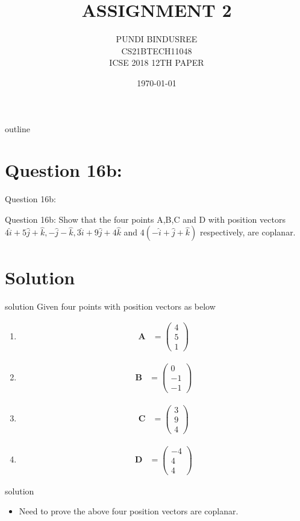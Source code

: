\documentclass{beamer}
\title{ASSIGNMENT 2}
\author{PUNDI BINDUSREE \\ CS21BTECH11048\\ ICSE 2018 12TH PAPER}
\date{\today}
\let\vec\mathbf
\newcommand{\myvec}[1]{\ensuremath{\begin{pmatrix}#1\end{pmatrix}}}
\begin{document}
\begin{frame}
\titlepage
\end{frame}

\logo{}
\begin{frame}{outline}
\tableofcontents
\end{frame}

\section{Question 16b:}
\begin{frame}{Question 16b:}
\begin{block}{Question 16b:}
Show that the four points A,B,C and D with position vectors $4\hat{i}+5\hat{j}+\hat{k},-\hat{j}-\hat{k},3\hat{i}+9\hat{j}+4\hat{k}$ and $4(-\hat{i}+\hat{j}+\hat{k})$ respectively, are coplanar.
\end{block}
\end{frame}


\section{Solution}
\begin{frame}{solution}
 Given four points with position vectors as below
\begin{enumerate}
     \item \begin{align}\vec{A} & =\myvec{4\\5\\1}\end{align}
     \item \begin{align}\vec{B} & =\myvec{0\\-1\\-1}\end{align}     
     \item \begin{align}\vec{C} & =\myvec{3\\9\\4}\end{align}     
     \item \begin{align}\vec{D} & =\myvec{-4\\4\\4}\end{align}
\end{enumerate}
\end{frame}
 
\begin{frame}{solution}
\begin{itemize}
    \item Need to prove the above four position vectors are coplanar.
\end{itemize}
\end{frame}
 
\end{document}
